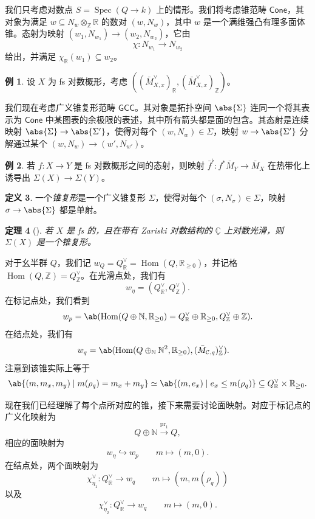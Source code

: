 \documentclass{amsart}
\newtheorem{thm}{定理}[section]
\theoremstyle{definition}
\newtheorem{defn}[thm]{定义}
\newtheorem{exm}[thm]{例}
\theoremstyle{remark}
\theoremstyle{plain}
\theoremstyle{definition}
\theoremstyle{remark}
\newcommand{\N}{\mathbb{N}}
\newcommand{\R}{\mathbb{R}}
\newcommand{\C}{\mathbb{C}}
\newcommand{\Z}{\mathbb{Z}}
\newcommand{\mc}[1]{\mathcal{#1}}
\newcommand{\on}[1]{\operatorname{#1}}
\newcommand{\ms}[1]{\mathsf{#1}}
\newcommand{\ul}[1]{\underline{#1}}
\newcommand{\1}{\mathbf{1}}
\newcommand{\2}{\mathbf{2}}
\newcommand{\3}{\mathbf{3}}
\DeclareMathOperator{\Hom}{Hom}
\DeclareMathOperator{\Spec}{Spec}
\begin{document}
我们只考虑对数点 \(S = \Spec(Q \to k)\) 上的情形。我们将考虑锥范畴 \(\ms{Cone}\)，其对象为满足 \(w \subseteq N_w \otimes_{\Z} \R\) 的数对 \((w, N_w)\)，其中 \(w\) 是一个满维强凸有理多面体锥。态射为映射 \((w_1, N_{w_1}) \to (w_2, N_{w_2})\)，它由
\[ \chi \colon N_{w_1} \to N_{w_2} \]
给出，并满足 \(\chi_{\R}(w_1) \subseteq w_2\)。

\begin{exm}
    设 \(X\) 为 fs 对数概形，考虑 \(( (\bar{M}_{X,x}^{\vee})_{\R}, (\bar{M}_{X,x}^{\vee})_{\Z} )\)。
\end{exm}

我们现在考虑广义锥复形范畴 \(\ms{GCC}\)。其对象是拓扑空间 \(\abs{\Sigma}\) 连同一个将其表示为 \(\ms{Cone}\) 中某图表的余极限的表述，其中所有箭头都是面的包含。其态射是连续映射 \(\abs{\Sigma} \to \abs{\Sigma'}\)，使得对每个 \((w, N_w) \in \Sigma\)，映射 \(w \to \abs{\Sigma'}\) 分解通过某个 \((w, N_w) \to (w', N_{w'})\)。

\begin{exm}
    若 \(f \colon X \to Y\) 是 fs 对数概形之间的态射，则映射 \(\bar{f}^{\flat} \colon f^* \bar{M}_Y \to \bar{M}_X\) 在热带化上诱导出 \(\Sigma(X) \to \Sigma(Y)\)。
\end{exm}

\begin{defn}
    一个\textit{锥复形}是一个广义锥复形 \(\Sigma\)，使得对每个 \((\sigma, N_{\sigma}) \in \Sigma\)，映射 \(\sigma \to \abs{\Sigma}\) 都是单射。
\end{defn}

\begin{thm}[{\cite{ACP2015}}]
    若 \(X\) 是 fs 的，且在带有 Zariski 对数结构的 \(\ul{\C}\) 上对数光滑，则 \(\Sigma(X)\) 是一个锥复形。
\end{thm}

对于幺半群 \(Q\)，我们记 \(w_Q = Q_{\R}^{\vee} = \Hom(Q, \R_{\geq 0})\)，并记格 \(\Hom(Q, \Z) = Q_{\Z}^{\vee}\)。在光滑点处，我们有
\[ w_{\eta} = (Q_{\R}^{\vee}, Q_{\Z}^{\vee}). \]
在标记点处，我们看到
\[ w_p = \ab(\Hom (Q \oplus \N, \R_{\geq 0}) = Q_{\R}^{\vee} \oplus \R_{\geq 0}, Q_{\Z}^{\vee}\oplus \Z). \]
在结点处，我们有
\begin{align*}
    w_q &= \ab(\Hom(Q \oplus_{\N} \N^2, \R_{\geq 0}), ( \bar{M}_{\mc{C}, q} )_{\Z}^{\vee}).
\end{align*}
注意到该锥实际上等于
\[ \ab\{(m, m_x, m_y) \mid m(\rho_q) = m_x + m_y \} \simeq \ab\{(m, e_x) \mid e_x \leq m(\rho_q) \} \subseteq Q_{\R}^{\vee} \times \R_{\geq 0}. \]

现在我们已经理解了每个点所对应的锥，接下来需要讨论面映射。对应于标记点的广义化映射为
\[ Q \oplus \N \xrightarrow{\on{pr}_1} Q, \]
相应的面映射为
\[ w_{\eta} \hookrightarrow w_p \qquad m \mapsto (m,0). \]
在结点处，两个面映射为
\[ \chi_{\eta_1}^{\vee} \colon Q_{\R}^{\vee} \to w_q \qquad m \mapsto (m, m(\rho_q)) \]
以及
\[ \chi_{\eta_2}^{\vee} \colon Q_{\R}^{\vee} \to w_q \qquad m \mapsto (m, 0). \]
\end{document}
